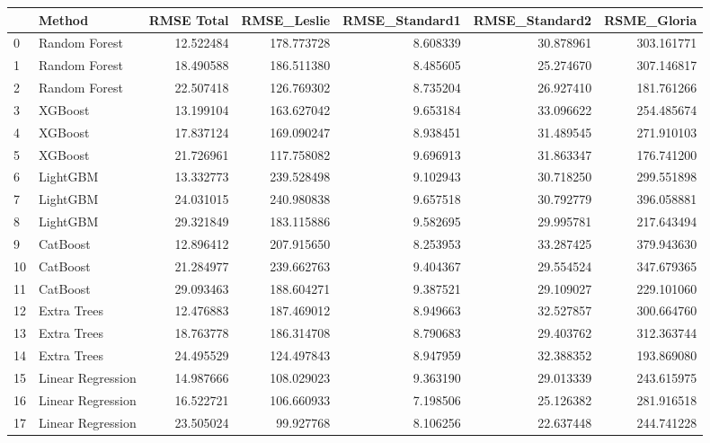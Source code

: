 \begin{tabular}{llrrrrr}
\toprule
{} &             Method &  RMSE Total &  RMSE\_Leslie &  RMSE\_Standard1 &  RMSE\_Standard2 &  RSME\_Gloria \\
\midrule
0  &      Random Forest &   12.522484 &   178.773728 &        8.608339 &       30.878961 &   303.161771 \\
1  &      Random Forest &   18.490588 &   186.511380 &        8.485605 &       25.274670 &   307.146817 \\
2  &      Random Forest &   22.507418 &   126.769302 &        8.735204 &       26.927410 &   181.761266 \\
3  &            XGBoost &   13.199104 &   163.627042 &        9.653184 &       33.096622 &   254.485674 \\
4  &            XGBoost &   17.837124 &   169.090247 &        8.938451 &       31.489545 &   271.910103 \\
5  &            XGBoost &   21.726961 &   117.758082 &        9.696913 &       31.863347 &   176.741200 \\
6  &           LightGBM &   13.332773 &   239.528498 &        9.102943 &       30.718250 &   299.551898 \\
7  &           LightGBM &   24.031015 &   240.980838 &        9.657518 &       30.792779 &   396.058881 \\
8  &           LightGBM &   29.321849 &   183.115886 &        9.582695 &       29.995781 &   217.643494 \\
9  &           CatBoost &   12.896412 &   207.915650 &        8.253953 &       33.287425 &   379.943630 \\
10 &           CatBoost &   21.284977 &   239.662763 &        9.404367 &       29.554524 &   347.679365 \\
11 &           CatBoost &   29.093463 &   188.604271 &        9.387521 &       29.109027 &   229.101060 \\
12 &        Extra Trees &   12.476883 &   187.469012 &        8.949663 &       32.527857 &   300.664760 \\
13 &        Extra Trees &   18.763778 &   186.314708 &        8.790683 &       29.403762 &   312.363744 \\
14 &        Extra Trees &   24.495529 &   124.497843 &        8.947959 &       32.388352 &   193.869080 \\
15 &  Linear Regression &   14.987666 &   108.029023 &        9.363190 &       29.013339 &   243.615975 \\
16 &  Linear Regression &   16.522721 &   106.660933 &        7.198506 &       25.126382 &   281.916518 \\
17 &  Linear Regression &   23.505024 &    99.927768 &        8.106256 &       22.637448 &   244.741228 \\
\bottomrule
\end{tabular}
